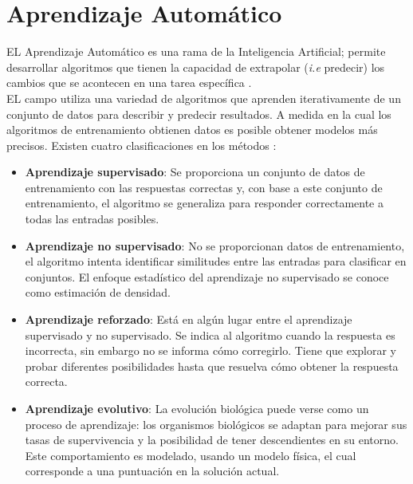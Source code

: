 \section{Aprendizaje Automático}

EL Aprendizaje Automático es una rama de la Inteligencia Artificial; permite desarrollar algoritmos que tienen la capacidad de extrapolar (\textit{i.e} predecir) los cambios que se acontecen en una tarea específica \citep{CT2}.\\

EL campo utiliza una variedad de algoritmos que aprenden iterativamente de un conjunto de
datos para describir y predecir resultados. A medida en la cual los algoritmos de 
entrenamiento obtienen datos es posible obtener modelos más precisos. Existen cuatro clasificaciones en los métodos \citep{CT21}:

\begin{itemize}

	\item \textbf{Aprendizaje supervisado}: Se proporciona un conjunto de datos de entrenamiento con las respuestas correctas y, con base a este conjunto de 
	entrenamiento, el algoritmo se generaliza para responder correctamente a todas 
	las entradas posibles.

	\item \textbf{Aprendizaje no supervisado}: No se proporcionan datos de entrenamiento, el algoritmo intenta identificar similitudes entre las entradas para clasificar en conjuntos. El enfoque estadístico del aprendizaje no 
	supervisado se conoce como estimación de densidad.

	\item \textbf{Aprendizaje reforzado}: Está en algún lugar entre el aprendizaje supervisado y no supervisado. Se indica al algoritmo cuando la respuesta es incorrecta, sin embargo no se informa
	cómo corregirlo. Tiene que explorar y probar diferentes posibilidades hasta que resuelva 
	cómo obtener la respuesta correcta.

	\item \textbf{Aprendizaje evolutivo}: La evolución biológica puede verse como un proceso de aprendizaje: los organismos biológicos se adaptan para mejorar sus tasas de supervivencia 
	y la posibilidad de tener descendientes en su entorno. Este comportamiento es modelado, 
	usando un modelo física, el cual corresponde a una puntuación en la 
	solución actual.

\end{itemize}

